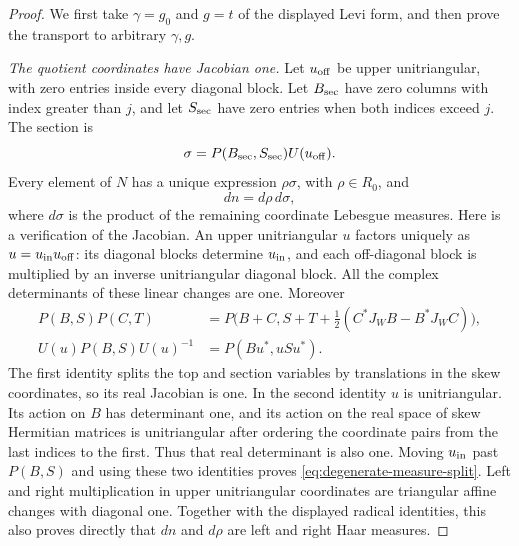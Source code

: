 \begin{proof}
We first take $\gamma=g_0$ and $g=t$ of the displayed Levi
form, and then prove the transport to arbitrary $\gamma,g$.

\emph{The quotient coordinates have Jacobian one.}
Let $u_{\rm off}$ be upper unitriangular, with zero entries
inside every diagonal block.  Let $B_{\rm sec}$ have zero
columns with index greater than $j$, and let $S_{\rm sec}$ have zero entries
when both indices exceed $j$.  The section is
\[
           \sigma=P(B_{\rm sec},S_{\rm sec})U(u_{\rm off}).
\]
Every element of $N$ has a unique expression $\rho\sigma$,
with $\rho\in R_0$, and
\begin{equation}\label{eq:degenerate-measure-split}
                         dn=d\rho\,d\sigma,
\end{equation}
where $d\sigma$ is the product of the remaining coordinate
Lebesgue measures.  Here is a verification of the Jacobian.
An upper unitriangular $u$ factors uniquely as
$u=u_{\rm in}u_{\rm off}$: its diagonal blocks determine
$u_{\rm in}$, and each off-diagonal block is multiplied by
an inverse unitriangular diagonal block.  All the complex
determinants of these linear changes are one.
Moreover
\begin{align*}
 P(B,S)P(C,T)
   &=P\bigl(B+C,S+T+\tfrac12(C^*J_WB-B^*J_WC)\bigr),\\
 U(u)P(B,S)U(u)^{-1}&=P(Bu^*,uSu^*).
\end{align*}
The first identity splits the top and section variables by
translations in the skew coordinates, so its real Jacobian is
one.  In the second identity $u$ is unitriangular.  Its action
on $B$ has determinant one, and its action on the real space
of skew Hermitian matrices is unitriangular after ordering the
coordinate pairs from the last indices to the first.  Thus
that real determinant is also one.  Moving $u_{\rm in}$ past
$P(B,S)$ and using these two identities proves
\eqref{eq:degenerate-measure-split}.  Left and right
multiplication in upper unitriangular coordinates are triangular
affine changes with diagonal one.  Together with the displayed
radical identities, this also proves directly that $dn$ and
$d\rho$ are left and right Haar measures.


\end{proof}
